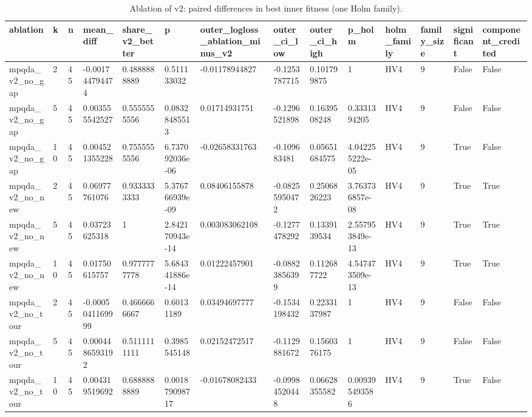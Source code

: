 \begin{table}[t]
\centering
\caption{Ablation of v2: paired differences in best inner fitness (one Holm family).}\label{tab:table_v2_ablation}
\begin{tabular}{llllllllllllll}
\hline
ablation & k & n & mean\_diff & share\_v2\_better & p & outer\_logloss\_ablation\_minus\_v2 & outer\_ci\_low & outer\_ci\_high & p\_holm & holm\_family & family\_size & significant & component\_credited \\
\hline
mpqda\_v2\_no\_gap & 2 & 45 & -0.001744794474 & 0.4888888889 & 0.511133032 & -0.01178944827 & -0.1253787715 & 0.101799875 & 1 & HV4 & 9 & False & False \\
mpqda\_v2\_no\_gap & 5 & 45 & 0.003555542527 & 0.5555555556 & 0.08328485513 & 0.01714931751 & -0.1296521898 & 0.1639508248 & 0.3331394205 & HV4 & 9 & False & False \\
mpqda\_v2\_no\_gap & 10 & 45 & 0.004521355228 & 0.7555555556 & 6.737092036e-06 & -0.02658331763 & -0.109683481 & 0.05651684575 & 4.042255222e-05 & HV4 & 9 & True & False \\
mpqda\_v2\_no\_new & 2 & 45 & 0.06977761076 & 0.9333333333 & 5.376766939e-09 & 0.08406155878 & -0.08255950472 & 0.2506826223 & 3.763736857e-08 & HV4 & 9 & True & True \\
mpqda\_v2\_no\_new & 5 & 45 & 0.03723625318 & 1 & 2.842170943e-14 & 0.003083062108 & -0.1277478292 & 0.1339139534 & 2.557953849e-13 & HV4 & 9 & True & True \\
mpqda\_v2\_no\_new & 10 & 45 & 0.01750615757 & 0.9777777778 & 5.684341886e-14 & 0.01222457901 & -0.08823856399 & 0.112687722 & 4.547473509e-13 & HV4 & 9 & True & True \\
mpqda\_v2\_no\_tour & 2 & 45 & -0.0005041169999 & 0.4666666667 & 0.60131189 & 0.03494697777 & -0.1534198432 & 0.2233137987 & 1 & HV4 & 9 & False & False \\
mpqda\_v2\_no\_tour & 5 & 45 & 0.0004486593192 & 0.5111111111 & 0.3985545148 & 0.02152472517 & -0.1129881672 & 0.1560376175 & 1 & HV4 & 9 & False & False \\
mpqda\_v2\_no\_tour & 10 & 45 & 0.004319519692 & 0.6888888889 & 0.001879098717 & -0.01678082433 & -0.09984520448 & 0.06628355582 & 0.009395493586 & HV4 & 9 & True & False \\
\hline
\end{tabular}
\end{table}
